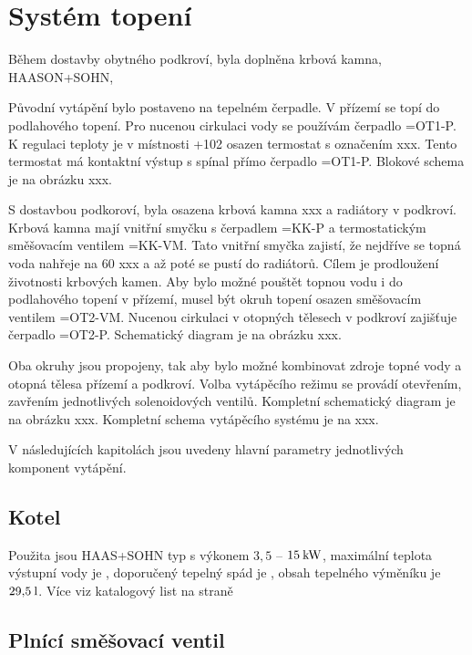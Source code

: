 \documentclass[a4paper,draft]{book}
\begin{document}
\chapter{Systém topení}\label{chap:heating}

    Během dostavby obytného podkroví, byla doplněna krbová kamna, HAASON+SOHN,

    \begin{tikzpicture}
        
    \end{tikzpicture}

Původní vytápění bylo postaveno na tepelném čerpadle. V přízemí se topí do
podlahového topení. Pro nucenou cirkulaci vody se používám čerpadlo =OT1-P.
K regulaci teploty je v místnosti +102 osazen termostat s označením
xxx. Tento termostat má kontaktní výstup s spínal přímo čerpadlo =OT1-P.
Blokové schema je na obrázku xxx.

S dostavbou podkoroví, byla osazena krbová kamna xxx a radiátory v podkroví.
Krbová kamna mají vnitřní smyčku s čerpadlem =KK-P a termostatickým
směšovacím ventilem =KK-VM. Tato vnitřní smyčka zajistí, že nejdříve
se topná voda nahřeje na 60 xxx a až poté se pustí do radiátorů.
Cílem je prodloužení životnosti krbových kamen. Aby bylo možné pouštět
topnou vodu i do podlahového topení v přízemí, musel být okruh topení
osazen směšovacím ventilem =OT2-VM. Nucenou cirkulaci v otopných tělesech
v podkroví zajišťuje čerpadlo =OT2-P. Schematický diagram je na obrázku xxx.

Oba okruhy jsou propojeny, tak aby bylo možné kombinovat zdroje topné vody
a otopná tělesa přízemí a podkroví. Volba vytápěcího režimu se provádí
otevřením, zavřením jednotlivých solenoidových ventilů. Kompletní schematický
diagram je na obrázku xxx. Kompletní schema vytápěcího systému je na
xxx.

V následujících kapitolách jsou uvedeny hlavní parametry jednotlivých
komponent vytápění. 


  \section{Kotel}

    Použita jsou  HAAS+SOHN typ  s výkonem
    $3{,}5$ -- $15\:\rm kW$, maximální teplota
    výstupní vody je , doporučený tepelný spád je , obsah
    tepelného výměníku je $29{,}5\:\rm l$. Více viz katalogový list na straně
    \pageref{apx:kotel}

  \section{Plnící směšovací ventil}
\end{document}
